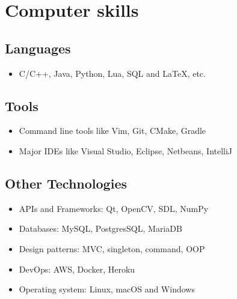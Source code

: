 \documentclass[10pt, letterpaper]{article}
\begin{document}
\section{Computer skills}
\begin{multicols}{2}
  \begin{minipage}{0.5\textwidth}
    \subsection{Languages}
    \begin{footnotesize}
      \begin{itemize}
        \item
          C/C++, Java, Python, Lua, SQL and \LaTeX, etc.
      \end{itemize}
    \end{footnotesize}
    \medskip

    \subsection{Tools}
    \begin{footnotesize}
      \begin{itemize}
        \item
          Command line tools like Vim, Git, CMake, Gradle
        \item
          Major IDEs like Visual Studio, Eclipse, Netbeans, IntelliJ
      \end{itemize}
    \end{footnotesize}
  \end{minipage}
  \columnbreak%

  \begin{minipage}{0.5\textwidth}
    \subsection{Other Technologies}
    \begin{footnotesize}
      \begin{itemize}
        \item
          APIs and Frameworks: Qt, OpenCV, SDL, NumPy
        \item
          Databases: MySQL, PostgresSQL, MariaDB
        \item
          Design patterns: MVC, singleton, command, OOP
        \item
          DevOps: AWS, Docker, Heroku
        \item
          Operating system: Linux, macOS and Windows
      \end{itemize}
    \end{footnotesize}
  \end{minipage}
\end{multicols}
\end{document}

